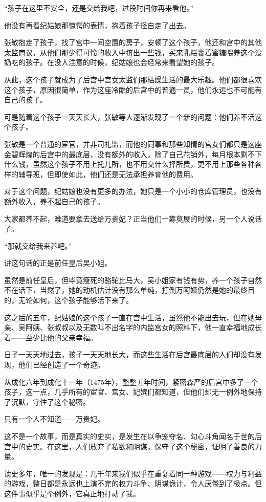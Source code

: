 \begin{multicols}{\theparacolNo}
“孩子在这里不安全，还是交给我吧，过段时间你再来看他。”

他没有再看纪姑娘那惊愕的表情，抱着孩子径自走了出去。

张敏抱走了孩子，找了宫中一间空置的房子，安顿了这个孩子，他还和宫中的其他太监商议，从他们那少得可怜的收入中挤出一些钱，买来乳糕裹着蜜糖喂养这个没奶吃的孩子。在没人注意的时候，纪姑娘也会经常来看望她的孩子。

从此，这个孩子就成为了后宫中宫女太监们那枯燥生活的最大乐趣。他们都很喜欢这个孩子，原因很简单，作为这座冷酷的后宫中的普通一员，他们永远也不可能有自己的孩子。

可是随着这个孩子一天天长大，张敏等人逐渐发现了一个新的问题：他们养不活这个孩子。

张敏是一个普通的宦官，并非司礼监，而他的同事和那些知情的宫女们都只是这座金碧辉煌的后宫中的最底层，没有额外的收入，除了自己花销外，每月根本剩不下什么钱，虽然这个孩子不用上托儿所，也不用交什么择所费，更不用上那些各种各样的辅导班，但即使如此，他们还是无法承担养育他的费用。

对于这个问题，纪姑娘也没有更多的办法，她只是一个小小的仓库管理员，也没有额外收入，养不起自己的孩子。

大家都养不起，难道要拿去送给万贵妃？正当他们一筹莫展的时候，另一个人说话了。

“那就交给我来养吧。”

讲这句话的正是前任皇后吴小姐。

虽然是前任皇后，但毕竟瘦死的骆驼比马大，吴小姐家有钱有势，养一个孩子自然不在话下，当然了，她的动机估计没有那么单纯，打倒万阿姨仍然是她的最终目的，无论如何，这个孩子能够活下来了。

这之后的五年，纪姑娘的这个孩子一直在宫中生活，虽然他不能出去玩，但在她母亲、吴阿姨、张叔叔以及无数叫不出名字的内监宫女的照料下，他一直幸福地成长着——至少比他的父亲幸福。

日子一天天地过去，孩子一天天地长大，而这些生活在后宫最底层的人们却没有发现，他们已经创造了一个奇迹。

从成化六年到成化十一年（1475年），整整五年时间，紧密森严的后宫中多了一个孩子，这一点，几乎所有的宦官、宫女、妃嫔们都知道，但他们却无一例外地保持了沉默，守住了这个秘密。

只有一个人不知道——万贵妃。

这不是一个故事，而是真实的史实，是发生在以争宠夺名、勾心斗角闻名于世的后宫中的史实。在这里，人们放弃了私欲和阴谋，保守了这个秘密，证明了善良的力量。

读史多年，唯一的发现是：几千年来我们似乎在重复着同一种游戏——权力与利益的游戏，整日都是永远也上演不完的权力斗争、阴谋诡计，令人厌倦到了极点。但这件事似乎是个例外，它真正地打动了我。


\end{multicols}
